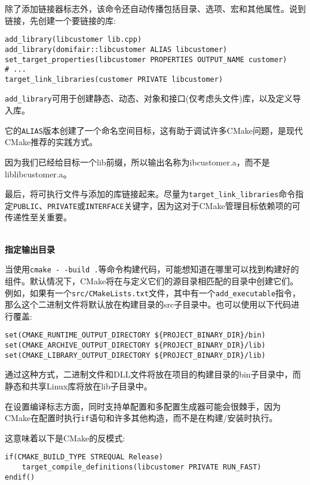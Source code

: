 除了添加链接器标志外，该命令还自动传播包括目录、选项、宏和其他属性。说到链接，先创建一个要链接的库:

\begin{lstlisting}[style=styleCMake]
add_library(libcustomer lib.cpp)
add_library(domifair::libcustomer ALIAS libcustomer)
set_target_properties(libcustomer PROPERTIES OUTPUT_NAME customer)
# ...
target_link_libraries(customer PRIVATE libcustomer)
\end{lstlisting}

\texttt{add\_library}可用于创建静态、动态、对象和接口(仅考虑头文件)库，以及定义导入库。

它的\texttt{ALIAS}版本创建了一个命名空间目标，这有助于调试许多CMake问题，是现代CMake推荐的实践方式。

因为我们已经给目标一个lib前缀，所以输出名称为ibcustomer.a，而不是liblibcustomer.a。

最后，将可执行文件与添加的库链接起来。尽量为\texttt{target\_link\_libraries}命令指定\texttt{PUBLIC}、\texttt{PRIVATE}或\texttt{INTERFACE}关键字，因为这对于CMake管理目标依赖项的可传递性至关重要。

\hspace*{\fill} \\ %
\noindent
\textbf{指定输出目录}

当使用\texttt{cmake -\,-build .}等命令构建代码，可能想知道在哪里可以找到构建好的组件。默认情况下，CMake将在与定义它们的源目录相匹配的目录中创建它们。例如，如果有一个\texttt{src/CMakeLists.txt}文件，其中有一个\texttt{add\_executable}指令，那么这个二进制文件将默认放在构建目录的src子目录中。也可以使用以下代码进行覆盖:

\begin{lstlisting}[style=styleCMake]
set(CMAKE_RUNTIME_OUTPUT_DIRECTORY ${PROJECT_BINARY_DIR}/bin)
set(CMAKE_ARCHIVE_OUTPUT_DIRECTORY ${PROJECT_BINARY_DIR}/lib)
set(CMAKE_LIBRARY_OUTPUT_DIRECTORY ${PROJECT_BINARY_DIR}/lib)
\end{lstlisting}

通过这种方式，二进制文件和DLL文件将放在项目的构建目录的bin子目录中，而静态和共享Linux库将放在lib子目录中。


在设置编译标志方面，同时支持单配置和多配置生成器可能会很棘手，因为CMake在配置时执行\texttt{if}语句和许多其他构造，而不是在构建/安装时执行。

这意味着以下是CMake的反模式:

\begin{lstlisting}[style=styleCMake]
if(CMAKE_BUILD_TYPE STREQUAL Release)
	target_compile_definitions(libcustomer PRIVATE RUN_FAST)
endif()
\end{lstlisting}


